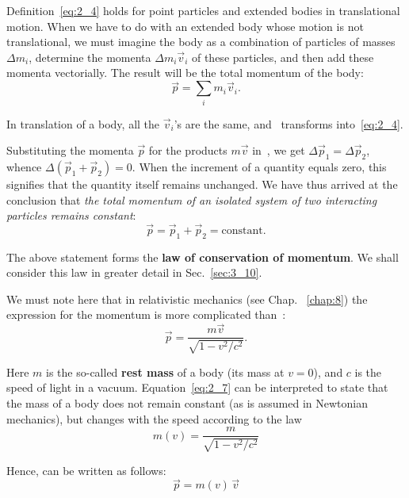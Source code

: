 \noindent
Definition~\eqref{eq:2_4} holds for point particles and extended bodies in translational motion. When we have to do with an extended body whose motion is not translational, we must imagine the body as a combination of particles of masses $\Delta m_i$, determine the momenta $\Delta m_i\vec{v}_i$ of these particles, and then add these momenta vectorially. The result will be the total momentum of the body:
\begin{equation}\label{eq:2_5}
\vec{p} = \sum_{i} m_i \vec{v}_i.
\end{equation}

\noindent
In translation of a body, all the $\vec{v}_i$'s are the same, and~ transforms into~\eqref{eq:2_4}.

Substituting the momenta $\vec{p}$ for the products $m\vec{v}$ in~, we get $\Delta\vec{p}_1=\Delta\vec{p}_2$, whence $\Delta(\vec{p}_1+\vec{p}_2)=0$. When the increment of a quantity equals zero, this signifies that the quantity itself remains unchanged. We have thus arrived at the conclusion that \textit{the total momentum of an isolated system of two interacting particles remains constant}:
\begin{equation}\label{eq:2_6}
\vec{p} = \vec{p}_1 + \vec{p}_2 = \text{constant}.
\end{equation}

\noindent
The above statement forms the \textbf{law of conservation of momentum}. We shall consider this law in greater detail in Sec.~\ref{sec:3_10}.

We must note here that in relativistic mechanics (see Chap. ~\ref{chap:8}) the expression for the momentum is more complicated than~:
\begin{equation}\label{eq:2_7}
\vec{p} = \frac{m \vec{v}}{\sqrt{1 - v^2/c^2}}.
\end{equation}

\noindent
Here $m$ is the so-called \textbf{rest mass} of a body (its mass at $v=0$), and $c$ is the speed of light in a vacuum. Equation~\eqref{eq:2_7} can be interpreted to state that the mass of a body does not remain constant (as is assumed in Newtonian mechanics), but changes with the speed according to the law
\begin{equation}\label{eq:2_8}
m(v) = \frac{m}{\sqrt{1 - v^2/c^2}}
\end{equation}

\noindent
Hence,  can be written as follows:
\begin{equation}\label{eq:2_9}
\vec{p} = m(v)\,\vec{v}
\end{equation}

